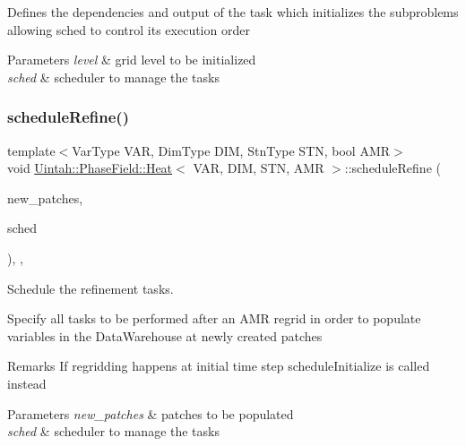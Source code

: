 Defines the dependencies and output of the task which initializes the subproblems allowing sched to control its execution order


\begin{DoxyParams}{Parameters}
{\em level} & grid level to be initialized \\
\hline
{\em sched} & scheduler to manage the tasks \\
\hline
\end{DoxyParams}
\mbox{\label{classUintah_1_1PhaseField_1_1Heat_af9bbe0180bc623d58e87a4bf7a5b6852}} 
\subsubsection{\texorpdfstring{schedule\+Refine()}{scheduleRefine()}}
{\footnotesize\ttfamily template$<$Var\+Type V\+AR, Dim\+Type D\+IM, Stn\+Type S\+TN, bool A\+MR$>$ \\
void \hyperlink{classUintah_1_1PhaseField_1_1Heat}{Uintah\+::\+Phase\+Field\+::\+Heat}$<$ V\+AR, D\+IM, S\+TN, A\+MR $>$\+::schedule\+Refine (\begin{DoxyParamCaption}\item[{const Patch\+Set $\ast$}]{new\+\_\+patches,  }\item[{SchedulerP \&}]{sched }\end{DoxyParamCaption})\hspace{0.3cm}{\ttfamily [override]}, {\ttfamily [protected]}, {\ttfamily [virtual]}}



Schedule the refinement tasks. 

Specify all tasks to be performed after an A\+MR regrid in order to populate variables in the Data\+Warehouse at newly created patches

\begin{DoxyRemark}{Remarks}
If regridding happens at initial time step schedule\+Initialize is called instead
\end{DoxyRemark}

\begin{DoxyParams}{Parameters}
{\em new\+\_\+patches} & patches to be populated \\
\hline
{\em sched} & scheduler to manage the tasks \\
\hline
\end{DoxyParams}
\mbox{\label{classUintah_1_1PhaseField_1_1Heat_a49c2b810f24594c25735da508deea0f7}} 
